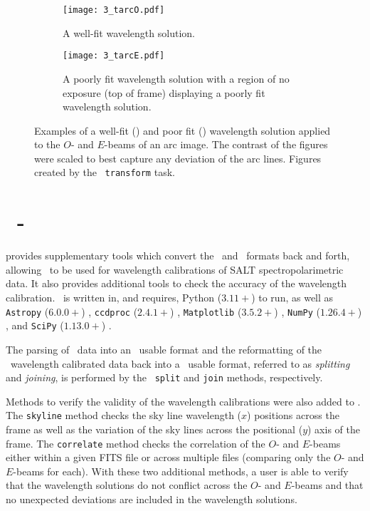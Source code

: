 \begin{figure}
    \centering
    \begin{subfigure}[b]{1.0 \textwidth}
        \centering
        \texttt{[image: 3\_tarcO.pdf]}
        \caption{A well-fit wavelength solution.}
        \label{fig:trans_O}
    \end{subfigure}
    \centering
    \begin{subfigure}[b]{1.0\textwidth}
        \centering
        \texttt{[image: 3\_tarcE.pdf]}
        \caption{A poorly fit wavelength solution with a region of no exposure (top of frame) displaying a poorly fit wavelength solution.}
        \label{fig:trans_E}
    \end{subfigure}
    \caption{Examples of a well-fit () and poor fit () wavelength solution applied to the $O$- and $E$-beams  of an arc image. The contrast of the figures were scaled to best capture any deviation of the arc lines. Figures created by the \iraf\ \texttt{transform} task.}
    \label{fig:iraf_trans_plot}
\end{figure}

\section[\textsc{stops}]{\stops\ - } \label{sec:stops}

 provides supplementary tools which convert the \polsalt\ and \iraf\ formats back and forth, allowing \iraf\ to be used for wavelength calibrations of \gls{SALT} spectropolarimetric data. It also provides additional tools to check the accuracy of the wavelength calibration.
\stops\ is written in, and requires, Python ($3.11+$) to run, as well as \texttt{Astropy} ($6.0.0+$) \citep{astropy:2013, astropy:2018, astropy:2022}, \texttt{ccdproc} ($2.4.1+$) \citep{ccdproc}, \texttt{Matplotlib} ($3.5.2+$) \citep{matplotlib}, \texttt{NumPy} ($1.26.4+$) \citep{numpy}, and \texttt{SciPy} ($1.13.0+$) \citep{scipy}.

The parsing of \polsalt\ data into an \iraf\ usable format and the reformatting of the \iraf\ wavelength calibrated data back into a \polsalt\ usable format, referred to as \textit{splitting} and \textit{joining}, is performed by the \stops\ \texttt{split} and \texttt{join} methods, respectively.

Methods to verify the validity of the wavelength calibrations were also added to \stops. The \texttt{skyline} method checks the sky line wavelength ($x$) positions across the frame as well as the variation of the sky lines across the positional ($y$) axis of the frame. The \texttt{correlate} method checks the correlation of the $O$- and $E$-beams either within a given \gls{FITS} file or across multiple files (comparing only the $O$- and $E$-beams for each). With these two additional methods, a user is able to verify that the wavelength solutions do not conflict across the $O$- and $E$-beams and that no unexpected deviations are included in the wavelength solutions.


